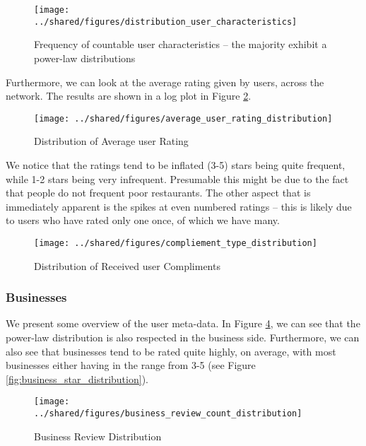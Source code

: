 \documentclass[letterpaper, 10 pt, conference]{ieeeconf}  %
\begin{document}
\begin{figure}[h!]
\centering
\texttt{[image: ../shared/figures/distribution\_user\_characteristics]}
\caption{Frequency of countable user characteristics -- the majority exhibit a power-law distributions}
\label{fig:user_characteristics}
\end{figure}

Furthermore, we can look at the average rating given by users, across the network. The results are shown in a log plot in Figure \ref{fig:user_rating_distribution}.

\begin{figure}[h!]
\centering
\texttt{[image: ../shared/figures/average\_user\_rating\_distribution]}
\caption{Distribution of Average user Rating}
\label{fig:user_rating_distribution}
\end{figure}

We notice that the ratings tend to be inflated (3-5) stars being quite frequent, while 1-2 stars being very infrequent. Presumable this might be due to the fact that people do not frequent poor restaurants. The other aspect that is immediately apparent is the spikes at even numbered ratings -- this is likely due to users who have rated only one once, of which we have many.

\begin{figure}[h!]
\centering
\texttt{[image: ../shared/figures/compliement\_type\_distribution]}
\caption{Distribution of Received user Compliments}
\label{fig:user_compliment_distribution}
\end{figure}

\subsubsection{Businesses}
We present some overview of the user meta-data. In Figure \ref{fig:business_review_distribution}, we can see that the power-law distribution is also respected in the business side. Furthermore, we can also see that businesses tend to be rated quite highly, on average, with most businesses either having in the range from 3-5 (see Figure \ref{fig:business_star_distribution}).

\begin{figure}[h!]
\centering
\texttt{[image: ../shared/figures/business\_review\_count\_distribution]}
\caption{Business Review Distribution}
\label{fig:business_review_distribution}
\end{figure}
\end{document}
